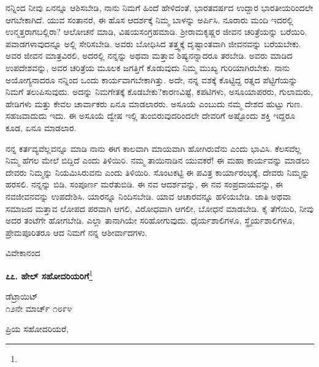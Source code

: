 \vspace{0.2cm}

ನನ್ನಿಂದ ನೀವು ಏನನ್ನೂ ಆಶಿಸಬೇಡಿ, ನಾನು ನಿಮಗೆ ಹಿಂದೆ ಹೇಳಿದಂತೆ, ಭಾರತವರ್ಷದ ಉದ್ದಾರ ಭಾರತೀಯರಿಂದಲೇ ಆಗಬೇಕಾಗಿದೆ. ಯುವ ಸಂತಾನರೆ, ಈ ಹೊಸ ಆದರ್ಶಕ್ಕೆ ನಿಮ್ಮ ಬಾಳನ್ನು ಅರ್ಪಿಸಿ. ನೂರಾರು ಮಂದಿ ಇದರಲ್ಲಿ ಉನ್ಮತ್ತರಾಗಬಲ್ಲಿರಾ? ಆಲೋಚನೆ ಮಾಡಿ, ವಿಷಯಸಂಗ್ರಹಮಾಡಿ. ಶ‍್ರೀರಾಮಕೃಷ್ಣರ ಜೀವನ ಚರಿತ್ರೆಯನ್ನು ಬರೆಯಿರಿ. ಪವಾಡಗಳಾವುದನ್ನೂ ಅಲ್ಲಿ ಸೇರಿಸಬೇಡಿ. ಅವರು ಬೋಧಿಸಿದ ತತ್ತ್ವಕ್ಕೆ ದೃಷ್ಟಾಂತವಾಗಿ ಜೀವನವನ್ನು ಬರೆಯಬೇಕು. ಅವರ ಜೀವನ ಮಾತ್ರವಿರಲಿ, ಅದರಲ್ಲಿ ನನ್ನನ್ನು ಅಥವಾ ಮತ್ತಾವ ಶಿಷ್ಯನನ್ನಾದರೂ ತರಬೇಡಿ. ಅವರು ಮಾಡಿದ ಉಪದೇಶವನ್ನು, ಅವರ ಚರಿತ್ರೆಯ ಮೂಲಕ ಜಗತ್ತಿಗೆ ಕೊಡುವುದು ನಿಮ್ಮ ಮುಖ್ಯ ಗುರಿಯಾಗಿರಬೇಕು. ನಾನು ಅಯೋಗ್ಯನಾದರೂ ನನ್ನಿಂದ ಒಂದು ಕಾರ್ಯವಾಗಬೇಕಾಗಿತ್ತು. ಅದೇ, ನನ್ನ ವಶಕ್ಕೆ ಕೊಟ್ಟಿದ್ದ ರತ್ನದ ಪೆಟ್ಟಿಗೆಯನ್ನು ನಿಮಗೆ ತಲುಪಿಸುವುದು. ಅದನ್ನು ನಿಮಗೇತಕ್ಕೆ ಕೊಡಬೇಕು?ಕಾರಣವಿಷ್ಟೆ, ಕಪಟಿಗಳು, ಅಸೂಯಾಪರರು, ಗುಲಾಮರು, ಹೇಡಿಗಳು ಮತ್ತು ಕೇವಲ ಚಾರ್ವಾಕರು ಏನೂ ಮಾಡಲಾರರು. ಅಸೂಯೆ ಎಂಬುದು ನಮ್ಮ ದೇಶದ ಹುಟ್ಟು ಗುಣ. ಸಹಜವಾದುದು ಇದು. ಈ ಅಸೂಯೆ ದ್ವೇಷ ಇಲ್ಲಿ ತುಂಬಿರುವುದರಿಂದಲೇ ದೇವರಿಗೆ ಅಷ್ಟೊಂದು ಶಕ್ತಿ ಇದ್ದರೂ ಕೂಡ, ಏನೂ ಮಾಡಲಾರ.

\vspace{0.2cm}

ನನ್ನ ಕರ್ತವ್ಯವೆಲ್ಲವನ್ನೂ ಮಾಡಿ ನಾನು ಈಗ ಕಾಲವಾಗಿ ಮಾಯವಾಗಿ ಹೋಗಿರುವೆನು ಎಂದು ಭಾವಿಸಿ. ಕೆಲಸವೆಲ್ಲ ನಿಮ್ಮ ಹೆಗಲ ಮೇಲೆ ಬಿದ್ದಿದೆ ಎಂದು ತಿಳಿಯಿರಿ. ನಮ್ಮ ತಾಯಿನಾಡಿನ ಯುವಕರೆ! ಈ ಮಹಾ ಕಾರ್ಯವನ್ನು ಮಾಡಲು ದೇವರು ನಿಮ್ಮನ್ನು ನಿಯಮಿಸಿರುವನು ಎಂದು ತಿಳಿಯಿರಿ. ಸೊಂಟಕಟ್ಟಿ ಈ ಪವಿತ್ರ ಕಾರ್ಯಾರಂಭಕ್ಕೆ, ದೇವರು ನಿಮ್ಮನ್ನು ಹರಸಲಿ. ನನ್ನನ್ನು ಬಿಡಿ. ಸಂಪೂರ್ಣ ಮರೆತುಬಿಡಿ. ಈ ನವ ಆದರ್ಶವನ್ನು, ಈ ನವ ಸಂಪ್ರದಾಯವನ್ನು, ಈ ನವಜೀವನವನ್ನು ಉಪದೇಶಿಸಿ. ಯಾರನ್ನೂ ನಿಂದಿಸಬೇಡಿ. ಯಾವ ಆಚಾರವನ್ನೂ ಹಳಿಯಬೇಡಿ. ಜಾತಿ ಅಥವಾ ಸಮಾಜದ ಮತ್ತಾವ ಲೋಪದ ಪರವಾಗಿ ಆಗಲಿ, ವಿರೋಧವಾಗಿ ಆಗಲೀ, ಬೋಧನೆ ಮಾಡಬೇಡಿ. ಕೈ ತೆಗೆಯಿರಿ, ನೀವು ಅದರ ತಂಟೆಗೇ ಹೋಗಬೇಡಿ. ಎಲ್ಲಾ ತಾನಾಗಿಯೇ ಸರಿಹೋಗುವುದು. ಧೈರ್ಯಶಾಲಿಗಳೂ, ಸ್ಥೈರ್ಯಶಾಲಿಗಳೂ, ಪ್ರೇಮಪೂರಿತರೂ ಆದ ನಿಮಗೆ ನನ್ನ ಆಶೀರ್ವಾದಗಳು.

\vspace{0.2cm}

{\flushright
ವಿವೇಕಾನಂದ\par}

\newpage

\begin{center}
\textbf{೭೭. ಹೇಲ್ ಸಹೋದರಿಯರಿಗೆ}\footnote{}
\end{center}

\begin{flushright}
ಡೆಟ್ರಾಯಿಟ್\\೧೨ನೇ ಮಾರ್ಚ್ ೧೮೯೪
\end{flushright}

\noindent
ಪ್ರಿಯ ಸಹೋದರಿಯರೆ,

